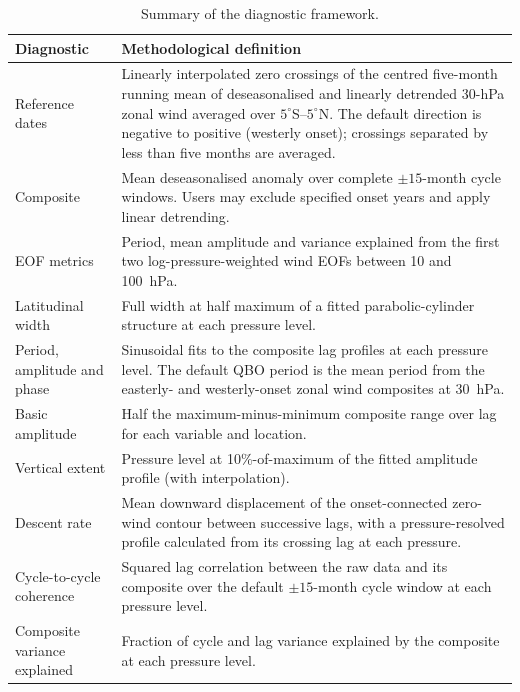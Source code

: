 \documentclass[11pt,a4paper]{article}
\begin{document}
\begin{table}[htbp]
\centering
\caption{Summary of the diagnostic framework.}
\begin{tabularx}{\textwidth}{@{}
>{\raggedright\arraybackslash}p{}X@{}}
\toprule
Diagnostic & Methodological definition \\
\midrule
Reference dates & Linearly interpolated zero crossings of the centred
five-month running mean of deseasonalised and linearly detrended 30-hPa zonal
wind averaged over $5^{\circ}$S--$5^{\circ}$N.  The default direction is
negative to positive (westerly onset); crossings separated by less than five
months are averaged. \\
Composite & Mean deseasonalised anomaly over complete $\pm15$-month cycle
windows. Users may exclude specified onset years and apply linear detrending. \\
EOF metrics & Period, mean amplitude and variance explained from the first
two log-pressure-weighted wind EOFs between 10 and 100~hPa. \\
Latitudinal width & Full width at half maximum of a fitted parabolic-cylinder
structure at each pressure level. \\
Period, amplitude and phase & Sinusoidal fits to the composite lag profiles at each pressure level.
The default QBO period is the mean period from the easterly- and
westerly-onset zonal wind composites at 30~hPa. \\
Basic amplitude & Half the maximum-minus-minimum composite range over lag for
each variable and location. \\
Vertical extent & Pressure level at 10\%-of-maximum of the fitted amplitude profile (with interpolation). \\
Descent rate & Mean downward displacement of the onset-connected zero-wind
contour between successive lags, with a pressure-resolved profile calculated
from its crossing lag at each pressure. \\
Cycle-to-cycle coherence & Squared lag correlation between the raw data and its composite over the default
$\pm15$-month cycle window at each pressure level.\\
Composite variance explained & Fraction of cycle and lag variance explained
by the composite at each pressure level.\\
\bottomrule
\end{tabularx}
\end{table}
\end{document}
